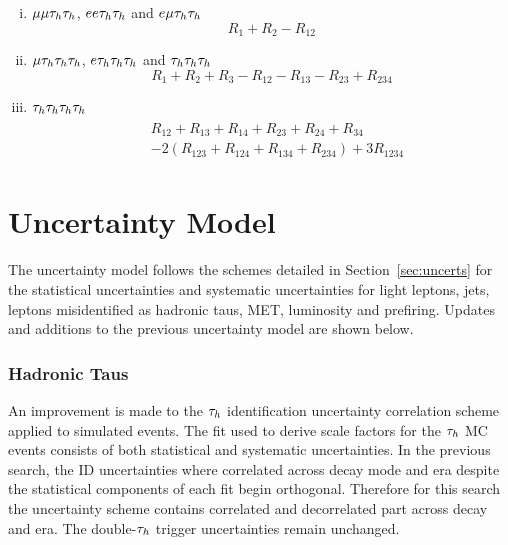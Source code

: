 \begin{enumerate}[i)]
\item $\mu\mu\tau_{h}\tau_{h}$, $ee\tau_{h}\tau_{h}$ and $e\mu\tau_{h}\tau_{h}$
\begin{equation}
R_1 + R_2 - R_{12}
\end{equation}

\item $\mu\tau_{h}\tau_{h}\tau_{h}$, $e\tau_{h}\tau_{h}\tau_{h}$ and $\tau_{h}\tau_{h}\tau_{h}$
\begin{equation}
R_1 + R_2 + R_3 - R_{12} - R_{13} - R_{23} + R_{234}
\end{equation}

\item $\tau_{h}\tau_{h}\tau_{h}\tau_{h}$
\begin{align}
\begin{split}
&R_{12} + R_{13} + R_{14} + R_{23} + R_{24} + R_{34} \\
&- 2(R_{123} + R_{124} + R_{134} + R_{234}) + 3R_{1234}
\end{split}
\end{align}
\end{enumerate}
 
\section{Uncertainty Model}

The uncertainty model follows the schemes detailed in Section~\ref{sec:uncerts} for the statistical uncertainties and systematic uncertainties for light leptons, jets, leptons misidentified as hadronic taus, MET, luminosity and prefiring.
Updates and additions to the previous uncertainty model are shown below. \\

\subsubsection{Hadronic Taus}
An improvement is made to the $\tau_{h}$ identification uncertainty correlation scheme applied to simulated events.
The fit used to derive scale factors for the $\tau_{h}$ \ac{MC} events consists of both statistical and systematic uncertainties.
In the previous search, the ID uncertainties where correlated across decay mode and era despite the statistical components of each fit begin orthogonal.
Therefore for this search the uncertainty scheme contains correlated and decorrelated part across decay and era.
The double-$\tau_{h}$ trigger uncertainties remain unchanged. \\

